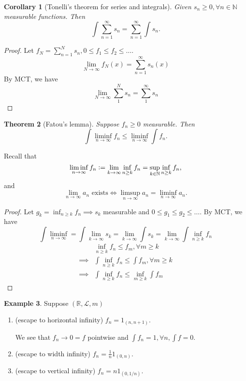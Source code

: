 \documentclass{report}
\newcommand{\R}{\mathbb{R}}
\newcommand{\N}{\mathbb{N}}
\newcommand{\defeq}{\vcentcolon=}
\newtheorem{theorem}{Theorem}[chapter]
\newtheorem{corollary}[theorem]{Corollary}
\theoremstyle{definition}
\newtheorem{example}[theorem]{Example}
\theoremstyle{remark}
\begin{document}
\begin{corollary}[Tonelli's theorem for series and integrals]
	Given $s_n \geq 0, \forall n \in \N$ measurable functions.
	Then
	\[
		\int \sum_{n=1}^\infty	s_n = \sum_{n=1}^\infty \int s_n.
	\]
\end{corollary}
\begin{proof}
	Let $f_N = \sum_{n=1}^N s_n, 0 \leq f_1 \leq f_2 \leq \ldots$.
	\[
		\lim_{N \to \infty}f_N(x) = \sum_{n=1}^\infty s_n(x)\]
	By MCT, we have \[
		\lim_{N \to \infty} \sum_1^N s_n = \sum_1^\infty s_n	
	\]
\end{proof}
\begin{theorem}[Fatou's lemma]
	Suppose $f_n \geq 0$ measurable. Then \[\int \liminf_{n \to \infty} f_n \leq \liminf_{n \to \infty}\int f_n.\]
\end{theorem}
Recall that \[
\liminf_{n \to \infty} f_n \defeq \lim_{k \to \infty} \inf_{n \geq k} f_n = \sup_{k \in \N} \inf_{n \geq k} f_n,
\]
and
\[
\lim_{n \to \infty} a_n \text{ exists} \iff \limsup_{n \to \infty} a_n = \liminf_{n \to \infty} a_n.
\]
\begin{proof}
	Let $g_k = \inf_{n \geq k} f_n \implies s_k$ measurable and $0 \leq g_1 \leq g_2 \leq \ldots$. By MCT, we have \[
		\int \liminf_{n \to \infty} = \int\lim_{k \to \infty} s_k = \lim_{k \to \infty} \int s_k = \lim_{k \to \infty} \int \inf_{n \geq k} f_n
	\]
	\begin{align*}
		& \inf_{n \geq k} f_n \leq f_m, \forall m \geq k \\
		\implies & \int \inf_{n \geq k}f_n \leq \int f_m, \forall m \geq k \\
		\implies & \int \inf_{n \geq k}f_n \leq \inf_{m \geq k}\int f_m
	\end{align*}

\end{proof}

\begin{example}
	Suppose $(\R, \mathcal{L}, m)$
	\begin{enumerate}
		\item (escape to horizontal infinity) $f_n = 1_{(n, n+1)}$.
		
		We see that $f_n \to 0 = f$ pointwise and $\int f_n = 1, \forall n, \int f = 0$.

		\item (escape to width infinity) $f_n = \frac{1}{n}1_{(0, n)}$.
		\item (escape to vertical infinity) $f_n = n1_{(0, 1/n)}$.
	\end{enumerate}	
\end{example}
\end{document}
